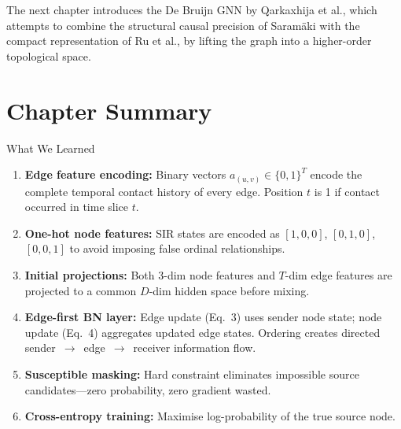 The next chapter introduces the De Bruijn GNN by Qarkaxhija et al., which attempts to combine the structural causal precision of Saramäki with the compact representation of Ru et al., by lifting the graph into a higher-order topological space.

\section{Chapter Summary}

\begin{conceptbox}{What We Learned}
\begin{enumerate}[noitemsep]
    \item \textbf{Edge feature encoding:} Binary vectors $a_{(u,v)} \in \{0,1\}^T$ encode the complete temporal contact history of every edge. Position $t$ is 1 if contact occurred in time slice $t$.
    \item \textbf{One-hot node features:} SIR states are encoded as $[1,0,0]$, $[0,1,0]$, $[0,0,1]$ to avoid imposing false ordinal relationships.
    \item \textbf{Initial projections:} Both 3-dim node features and $T$-dim edge features are projected to a common $D$-dim hidden space before mixing.
    \item \textbf{Edge-first BN layer:} Edge update (Eq.~3) uses sender node state; node update (Eq.~4) aggregates updated edge states. Ordering creates directed sender~$\to$~edge~$\to$~receiver information flow.
    \item \textbf{Susceptible masking:} Hard constraint eliminates impossible source candidates---zero probability, zero gradient wasted.
    \item \textbf{Cross-entropy training:} Maximise log-probability of the true source node.
\end{enumerate}
\end{conceptbox}
